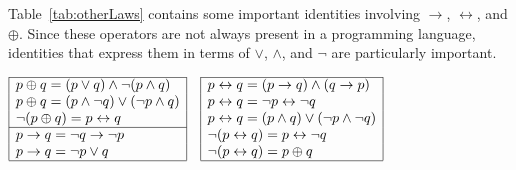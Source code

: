 %




Table~\ref{tab:otherLaws} contains some important identities involving $\rightarrow$, $\leftrightarrow$, and $\oplus$.
Since these operators are not always present in a programming language,
identities that express them in terms of $\vee$, $\wedge$, and $\neg$ are particularly important.

\begin{table}[h]
\centering
$
\begin{array}{|l|c|l|}
\cline{1-1}\cline{3-3}
p\oplus q = (p\vee q)\wedge \neg(p\wedge q)		&&p\leftrightarrow q = (p\rightarrow q)\wedge (q\rightarrow p)\\
p\oplus q = (p\wedge\neg q)\vee(\neg p\wedge q)	&&p\leftrightarrow q = \neg p\leftrightarrow \neg q\\
\neg(p\oplus q) = p\leftrightarrow q 			&&p\leftrightarrow q = (p\wedge q)\vee (\neg p \wedge \neg q)\\
\cline{1-1}
p\rightarrow q = \neg q \rightarrow \neg p 		&&\neg(p\leftrightarrow q) = p\leftrightarrow\neg q\\
p\rightarrow q = \neg p \vee q					&&\neg(p\leftrightarrow q) = p\oplus q\\
\cline{1-1}\cline{3-3}
\end{array}
$
\caption{Logical equivalences involving $\rightarrow$, $\leftrightarrow$, and $\oplus$}\label{tab:otherLaws}
\end{table}


